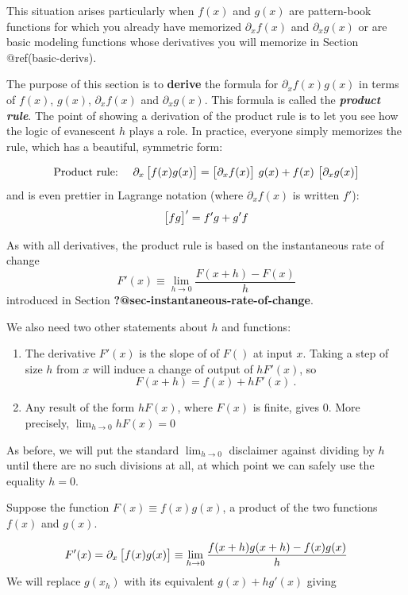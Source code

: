 \documentclass[
  letterpaper,
  DIV=11,
  numbers=noendperiod,
  oneside]{scrreprt}
\providecommand{\tightlist}{%
  \setlength{\itemsep}{0pt}\setlength{\parskip}{0pt}}
\begin{document}
This situation arises particularly when \(f(x)\) and \(g(x)\) are
pattern-book functions for which you already have memorized
\(\partial_x f(x)\) and \(\partial_x g(x)\) or are basic modeling
functions whose derivatives you will memorize in Section
@ref(basic-derivs).

The purpose of this section is to \textbf{derive} the formula for
\(\partial_x f(x) g(x)\) in terms of \(f(x)\), \(g(x)\),
\(\partial_x f(x)\) and \(\partial_x g(x)\). This formula is called the
\textbf{\emph{product rule}}. The point of showing a derivation of the
product rule is to let you see how the logic of evanescent \(h\) plays a
role. In practice, everyone simply memorizes the rule, which has a
beautiful, symmetric form:

\[\text{Product rule:}\ \ \ \ \partial_x \left[\strut f(x)g(x)\right] = \left[\strut \partial_x f(x)\right]\, g(x) + f(x)\, \left[\strut\partial_x g(x)\right]\]
and is even prettier in Lagrange notation (where \(\partial_x f(x)\) is
written \(f'\)): \[ \left[\strut f g\right]' = f' g + g' f\]

As with all derivatives, the product rule is based on the instantaneous
rate of change
\[F'(x) \equiv \lim_{h\rightarrow 0} \frac{F(x+h) - F(x)}{h}\]
introduced in Section \textbf{?@sec-instantaneous-rate-of-change}.

We also need two other statements about \(h\) and functions:

\begin{enumerate}
\def\labelenumi{\arabic{enumi}.}
\tightlist
\item
  The derivative \(F'(x)\) is the slope of of \(F()\) at input \(x\).
  Taking a step of size \(h\) from \(x\) will induce a change of output
  of \(h F'(x)\), so \[F(x+h) = f(x) + h F'(x)\ .\]
\item
  Any result of the form \(h F(x)\), where \(F(x)\) is finite, gives 0.
  More precisely, \(\lim_{h\rightarrow 0} h F(x) = 0\)
\end{enumerate}

As before, we will put the standard \(\lim_{h\rightarrow 0}\) disclaimer
against dividing by \(h\) until there are no such divisions at all, at
which point we can safely use the equality \(h = 0\).

Suppose the function \(F(x) \equiv f(x) g(x)\), a product of the two
functions \(f(x)\) and \(g(x)\).

\[F'(x) = \partial_x \left[\strut f(x) g(x) \right] \equiv \lim_{h\rightarrow 0}\frac{f(x+h) g(x+h) - f(x) g(x)}{h}\]
We will replace \(g(x_h)\) with its equivalent \(g(x) + h g'(x)\) giving
\end{document}
